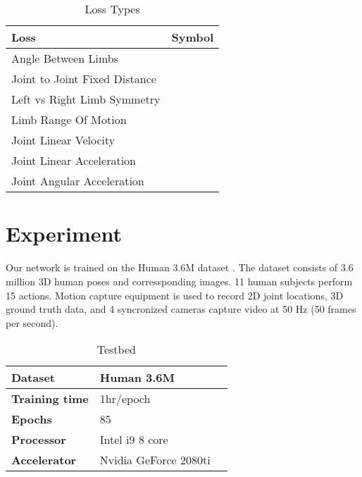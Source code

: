 \documentclass[runningheads]{llncs}
\begin{document}
\\\\
\fi



\begin{table}
\centering
\caption{\label{tab:table-name}Loss Types}
\begin{tabular}{|l|l|}
\hline
\textbf{Loss} &
\textbf{Symbol} \\

\hline
        Angle Between Limbs &
        
        \\
\hline
        Joint to Joint Fixed Distance &
        
        \\
\hline
        Left vs Right Limb Symmetry&
        
        \\
\hline
        Limb Range Of Motion &
        
        \\
\hline
        Joint Linear Velocity &
        
        \\
\hline
        Joint Linear Acceleration &
        
        \\
\hline
        Joint Angular Acceleration &
        
        \\
\hline
\end{tabular}



\end{table}



\section{Experiment}

Our network is trained on the Human 3.6M dataset \cite{ionescu2014iterated}. The dataset consists of 3.6 million 3D human poses and corressponding images. 11 human subjects perform 15 actions. Motion capture equipment is used to record 2D joint locations, 3D ground truth data, and 4 syncronized cameras capture video at 50 Hz (50 frames per second).

\begin{table}
\caption{Testbed}
\begin{center}
\small
\begin{tabular}{|l|l|l|}\hline
\textbf{Dataset} & Human 3.6M \\ \hline
\textbf{Training time} & 1hr/epoch\\ \hline
\textbf{Epochs} & 85 \\ \hline
\textbf{Processor} & Intel i9 8 core \\ \hline
\textbf{Accelerator} & Nvidia GeForce 2080ti \\ \hline
\end{tabular}
\end{center}
\label{table:testbed}
\end{table}
\end{document}

